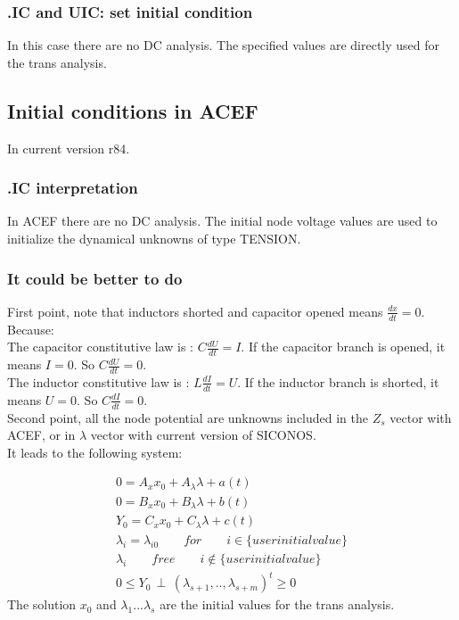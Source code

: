 \subsubsection{.IC and UIC: set initial condition }
In this case there are no DC analysis. The specified values are directly used for the trans
analysis.

\subsection{Initial conditions in ACEF}
In current version r84.\\
\subsubsection{.IC interpretation}
In ACEF there are no DC analysis. The initial node voltage values are used to initialize the
dynamical unknowns of type TENSION.
\subsubsection{It could be better to do}
First point, note that inductors shorted and capacitor opened means $\frac{dx}{dt}=0$. Because:\\
The capacitor constitutive law is : $C\frac{dU}{dt}=I$. If the capacitor branch is opened, it means
$I=0$. So $C\frac{dU}{dt}=0$.\\
The inductor constitutive law is : $L\frac{dI}{dt}=U$. If the inductor branch is shorted, it means
$U=0$. So $C\frac{dI}{dt}=0$.\\
Second point, all the node potential are unknowns included in the $Z_{s}$ vector with ACEF, or in
$\lambda$ vector with current version of SICONOS.\\

It leads to the following system:

 \begin{eqnarray}
0=A_{x}x_{0} +A_{\lambda} \lambda +a(t)\\
0=B_{x}x_{0}+ B_{\lambda}\lambda + b(t)\\
Y_{0}=C_{x}x_{0}+C_{\lambda}\lambda + c(t) \\
\lambda_{i} = \lambda_{i0} \qquad for \qquad i \in \{ user initial value \}\\
\lambda_{i} \qquad free \qquad i \notin \{ user initial value \}\\
0 \leq Y_0 \, \perp \, (\lambda_{s+1},..,\lambda_{s+m})^{t} \geq 0
\end{eqnarray}
The solution $x_{0}$ and $\lambda_{1}...\lambda_{s}$ are the initial values for the trans analysis.
\newpage

